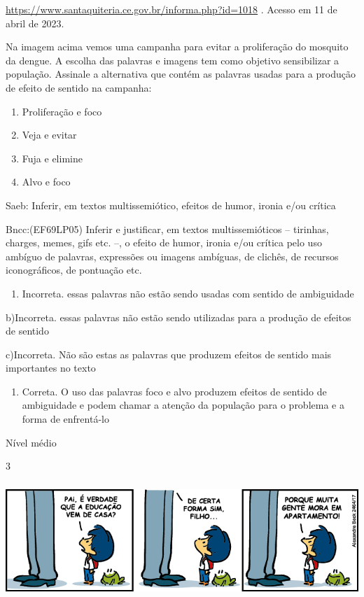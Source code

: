 {\href{https://www.santaquiteria.ce.gov.br/informa.php?id=1018}{\uline{https://www.santaquiteria.ce.gov.br/informa.php?id=1018}}
. Acesso em 11 de abril de 2023.

Na imagem acima vemos uma campanha para evitar a proliferação do
mosquito da dengue. A escolha das palavras e imagens tem como objetivo
sensibilizar a população. Assinale a alternativa que contém as palavras
usadas para a produção de efeito de sentido na campanha:

\begin{enumerate}
\def\labelenumi{\alph{enumi})}
\item
  Proliferação e foco
\item
  Veja e evitar
\item
  Fuja e elimine
\item
  Alvo e foco
\end{enumerate}

Saeb: Inferir, em textos multissemiótico, efeitos de humor, ironia e/ou
crítica

Bncc:(EF69LP05) Inferir e justificar, em textos multissemióticos --
tirinhas, charges, memes, gifs etc. --, o efeito de humor, ironia e/ou
crítica pelo uso ambíguo de palavras, expressões ou imagens ambíguas, de
clichês, de recursos iconográficos, de pontuação etc.

\begin{enumerate}
\def\labelenumi{\arabic{enumi}.}
\tightlist
\item
  Incorreta. essas palavras não estão sendo usadas com sentido de
  ambiguidade
\end{enumerate}

b)Incorreta. essas palavras não estão sendo utilizadas para a produção
de efeitos de sentido

c)Incorreta. Não são estas as palavras que produzem efeitos de sentido
mais importantes no texto

\begin{enumerate}
\def\labelenumi{\arabic{enumi}.}
\tightlist
\item
  Correta. O uso das palavras foco e alvo produzem efeitos de sentido de
  ambiguidade e podem chamar a atenção da população para o problema e a
  forma de enfrentá-lo
\end{enumerate}

Nível médio

\num{3}

\includegraphics[width=5.90551in,height=1.70833in]{./imgSAEB_7_POR/media/image7.png}

}
